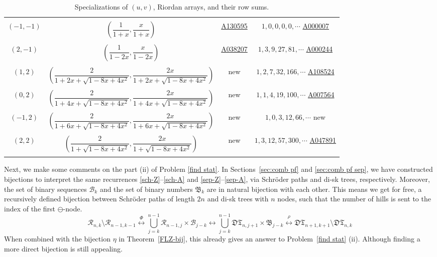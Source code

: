 \documentclass[11pt,reqno]{amsart}
\numberwithin{equation}{section}
\theoremstyle{plain}
\theoremstyle{definition}
\newcommand{\R}{\mathcal{R}}
\newcommand{\B}{\mathcal{B}}
\newcommand{\I}{\mathfrak{B}}
\def\DT{\mathfrak{DT}}
\begin{document}
\begin{table}
{\begin{tabular}{cccc}
&&&\\
$(-1,-1)$ & $(\dfrac{1}{1+x},\dfrac{x}{1+x})$ & \href{http://oeis.org/A130595}{A130595} & $1,0,0,0,0,\cdots$ \href{http://oeis.org/A000007}{A000007}\\
&&&\\
$(2,-1)$ & $(\dfrac{1}{1-2x},\dfrac{x}{1-2x})$ & \href{http://oeis.org/A038207}{A038207} & $1,3,9,27,81,\cdots$ \href{http://oeis.org/A000244}{A000244}\\
&&&\\
$(1,2)$ & $(\dfrac{2}{1+2x+\sqrt{1-8x+4x^2}},\dfrac{2x}{1+2x+\sqrt{1-8x+4x^2}})$ & new & $1,2,7,32,166,\cdots$ \href{http://oeis.org/A108524}{A108524}\\
&&&\\
$(0,2)$ & $(\dfrac{2}{1+4x+\sqrt{1-8x+4x^2}},\dfrac{2x}{1+4x+\sqrt{1-8x+4x^2}})$ & new & $1,1,4,19,100,\cdots$ \href{http://oeis.org/A007564}{A007564}\\
&&&\\
$(-1,2)$ & $(\dfrac{2}{1+6x+\sqrt{1-8x+4x^2}},\dfrac{2x}{1+6x+\sqrt{1-8x+4x^2}})$ & new & $1,0,3,12,66,\cdots$ new\\
&&&\\
$(2,2)$ & $(\dfrac{2}{1+\sqrt{1-8x+4x^2}},\dfrac{2x}{1+\sqrt{1-8x+4x^2}})$ & new & $1,3,12,57,300,\cdots$ \href{http://oeis.org/A047891}{A047891}\\
&&&\\
\bottomrule
\end{tabular}
}
\caption{Specializations of $(u,v)$, Riordan arrays, and their row sums.}
\label{uv-specialization}
\end{table}

Next, we make some comments on the part (ii) of Problem \ref{find stat}. In Sections~\ref{sec:comb pf} and \ref{sec:comb pf sep}, we have constructed bijections to interpret the same recurrences \eqref{sch-Z}--\eqref{sch-A} and \eqref{sep-Z}--\eqref{sep-A}, via Schr\"oder paths and di-sk trees, respectively. Moreover, the set of binary sequences $\B_k$ and the set of binary numbers $\I_k$ are in natural bijection with each other. This means we get for free, a recursively defined bijection between Schr\"oder paths of length $2n$ and di-sk trees with $n$ nodes, such that the number of hills is sent to the index of the first $\ominus$-node.
$$\R_{n,k}\setminus\R_{n-1,k-1}\stackrel{\Phi}{\longleftrightarrow}\bigcup_{j=k}^{n-1}\R_{n-1,j}\times\B_{j-k}\longleftrightarrow\bigcup_{j=k}^{n-1}\DT_{n,j+1}\times\I_{j-k}\stackrel{\rho}{\longleftrightarrow}\DT_{n+1,k+1}\setminus\DT_{n,k}$$
When combined with the bijection $\eta$ in Theorem~\ref{FLZ-bij}, this already gives an answer to Problem~\ref{find stat} (ii). Although finding a more direct bijection is still appealing.
\end{document}
